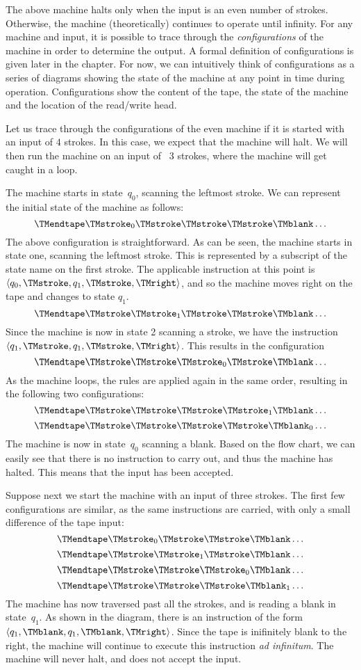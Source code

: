 \documentclass[../../../include/open-logic-section]{subfiles}
\begin{document}
\begin{explain}
The above machine halts only when the input is an even number of strokes.
Otherwise, the machine (theoretically) continues to operate until infinity. 
For any machine and input, it is possible to trace through the 
\emph{configurations} of the machine in order to determine the output. 
A formal definition of configurations is given later in the chapter. For now,
we can intuitively think of configurations as a series of diagrams showing the 
state of the machine at any point in time during operation.
Configurations show the content of the tape, the state of the machine and the
location of the read/write head.

Let us trace through the configurations of the even machine if it is started with
 an input of $4$ strokes. In this case, we expect that the machine will halt. 
 We will then run the machine on an input of ~$3$ strokes, where the machine will
  get caught in a loop. 

The machine starts in state~$q_0$, scanning the leftmost stroke.
We can represent the initial state of the machine as follows:
\[
\TMendtape \TMstroke_0 \TMstroke \TMstroke \TMstroke \TMblank \ldots
\]
The above configuration is straightforward. As can be seen, the machine starts
in state one, scanning the leftmost stroke. This is represented by a subscript of
the state name on the first stroke. The applicable instruction at this point is $\langle
q_0, \TMstroke, q_1, \TMstroke, \TMright \rangle$, and so the machine moves
right on the tape and changes to state $q_1$.
\[
\TMendtape \TMstroke \TMstroke_1 \TMstroke \TMstroke \TMblank \ldots
\]
Since the machine is now in state 2 scanning a stroke, we have the instruction
$\langle q_1, \TMstroke, q_1, \TMstroke, \TMright \rangle$. This results in the
configuration
\[
\TMendtape \TMstroke \TMstroke \TMstroke_0 \TMstroke \TMblank \ldots
\]
As the machine loops, the rules are applied again in the same order, resulting
in the following two configurations:
\[
\TMendtape \TMstroke \TMstroke \TMstroke \TMstroke_1 \TMblank \ldots
\]
\[
\TMendtape \TMstroke \TMstroke \TMstroke \TMstroke \TMblank_0 \ldots
\]
The machine is now in state~$q_0$ scanning a blank. Based on the flow
chart, we can easily see that there is no instruction to carry out, and thus the
machine has halted. This means that the input has been accepted.

Suppose next we start the machine with an input of three strokes. The
first few configurations are similar, as the same instructions are carried, with
only a small difference of the tape input:
\[
\TMendtape \TMstroke_0 \TMstroke \TMstroke \TMblank \ldots
\]
\[
\TMendtape \TMstroke \TMstroke_1 \TMstroke \TMblank \ldots
\]
\[
\TMendtape \TMstroke \TMstroke \TMstroke_0 \TMblank \ldots
\]
\[
\TMendtape \TMstroke \TMstroke \TMstroke \TMblank_1 \ldots
\]
The machine has now traversed past all the strokes, and is reading
a blank in state~$q_1$. As shown in the diagram, there is an instruction
of the form $\langle q_1, \TMblank, q_1, \TMblank, \TMright \rangle$.
Since the tape is inifinitely blank to the right, the machine will continue to
execute this instruction \emph{ad infinitum}. The machine will never halt,
and does not accept the input.
\end{explain}
\end{document}
